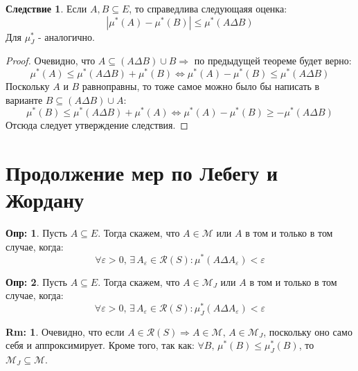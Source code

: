 \documentclass[12pt]{article}
\newcommand{\MCR}{\mathcal{R}}
\newcommand{\MM}{\mathcal{M}}
\newcommand{\VE}{\varepsilon}
\theoremstyle{definition}
\newtheorem{defn}{Опр:}
\newtheorem{rem}{Rm:}
\newtheorem{corollary}{Следствие}
\begin{document}
\begin{corollary}
	Если $A, B \subseteq E$, то справедлива следующаяя оценка:
	$$
		|\mu^*(A) - \mu^*(B)| \leq \mu^*(A\Delta B)
	$$
	Для $\mu^*_J$ - аналогично.
\end{corollary}
\begin{proof}
	Очевидно, что $A \subseteq (A \Delta B) \cup B \Rightarrow $ по предыдущей теореме будет верно:
	$$
		\mu^*(A) \leq \mu^*(A \Delta B) + \mu^*(B) \Leftrightarrow \mu^*(A) - \mu^*(B) \leq \mu^*(A\Delta B)
	$$
	Поскольку $A$ и $B$ равноправны, то тоже самое можно было бы написать в варианте $B \subseteq (A \Delta B) \cup A$: 
	$$
		\mu^*(B) \leq \mu^*(A \Delta B) + \mu^*(A) \Leftrightarrow \mu^*(A) - \mu^*(B) \geq -\mu^*(A\Delta B)
	$$
	Отсюда следует утверждение следствия.
\end{proof}
\newpage
\section*{Продолжение мер по Лебегу и Жордану}
\begin{defn}
	Пусть $A \subseteq E$. Тогда скажем, что $A \in \MM$ или $A$  в том и только в том случае, когда:
	$$
		\forall \VE > 0, \, \exists \, A_\VE \in \MCR(S) \colon \mu^*(A \Delta A_\VE) < \VE
	$$
\end{defn}

\begin{defn}
	Пусть $A \subseteq E$. Тогда скажем, что $A \in \MM_J$ или $A$  в том и только в том случае, когда:
	$$
		\forall \VE > 0, \, \exists \, A_\VE \in \MCR(S) \colon \mu_J^*(A \Delta A_\VE) < \VE
	$$
\end{defn}
\begin{rem}
	Очевидно, что если $A \in \MCR(S) \Rightarrow A \in \MM, \, A \in \MM_J$, поскольку оно само себя и аппроксимирует. Кроме того, так как:
	$\forall B, \, \mu^*(B) \leq \mu^*_J(B)$, то $\MM_J \subseteq \MM$.
\end{rem}
\end{document}
